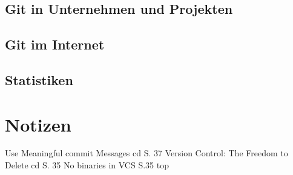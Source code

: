 \section{Git in Unternehmen und Projekten}
\section{Git im Internet}
\section{Statistiken}
\chapter{\result}\label{cha:result}

\chapter{Notizen}
Use Meaningful commit Messages cd S. 37
Version Control: The Freedom to Delete cd S. 35
No binaries in VCS S.35 top
